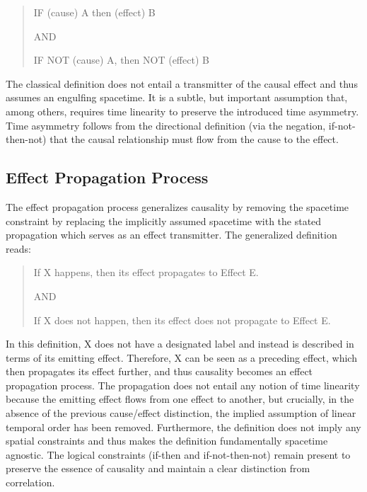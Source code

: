 \documentclass{article}
\begin{document}
\begin{quote}
\begin{center}
        IF (cause) A then (effect) B

    AND 
    
    IF NOT (cause) A, then NOT (effect) B
\end{center}
\end{quote}


The classical definition does not entail a transmitter of the causal effect and thus assumes an engulfing spacetime. It is a subtle, but important assumption that, among others, requires time linearity to preserve the introduced time asymmetry. Time asymmetry follows from the directional definition (via the negation, if-not-then-not) that the causal relationship must flow from the cause to the effect.


\subsection{Effect Propagation Process}
\label{subsec:Effect_Propagation_Process}

The effect propagation process generalizes causality by removing the spacetime constraint by replacing the implicitly assumed spacetime with the stated propagation which serves as an effect transmitter. The generalized definition reads:

\begin{quote}
\begin{center}
        If X happens, then its effect propagates to Effect E.
    
    AND
    
    If X does not happen, then its effect does not propagate to Effect E.
\end{center}
\end{quote}


In this definition, X does not have a designated label and instead is described in terms of its emitting effect. Therefore, X can be seen as a preceding effect, which then propagates its effect further, and thus causality becomes an effect propagation process. The propagation does not entail any notion of time linearity because the emitting effect flows from one effect to another, but crucially, in the absence of the previous cause/effect distinction, the implied assumption of linear temporal order has been removed.
Furthermore, the definition does not imply any spatial constraints and thus makes the definition fundamentally spacetime agnostic. The logical constraints (if-then and if-not-then-not) remain present to preserve the essence of causality and maintain a clear distinction from correlation.
\end{document}
